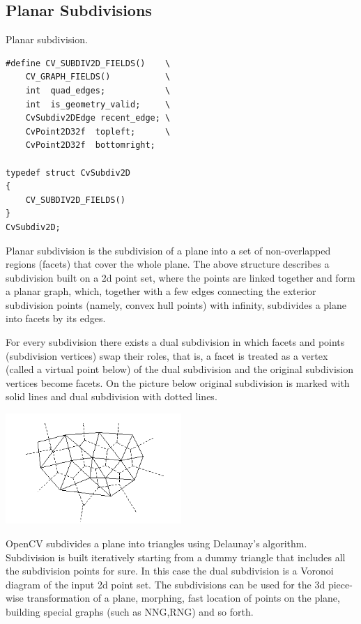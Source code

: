 \subsection{Planar Subdivisions}

\label{CvSubdiv2D}

Planar subdivision.

\begin{lstlisting}
#define CV_SUBDIV2D_FIELDS()    \
    CV_GRAPH_FIELDS()           \
    int  quad_edges;            \
    int  is_geometry_valid;     \
    CvSubdiv2DEdge recent_edge; \
    CvPoint2D32f  topleft;      \
    CvPoint2D32f  bottomright;

typedef struct CvSubdiv2D
{
    CV_SUBDIV2D_FIELDS()
}
CvSubdiv2D;
\end{lstlisting}

Planar subdivision is the subdivision of a plane into a set of
non-overlapped regions (facets) that cover the whole plane. The above
structure describes a subdivision built on a 2d point set, where the points
are linked together and form a planar graph, which, together with a few
edges connecting the exterior subdivision points (namely, convex hull points)
with infinity, subdivides a plane into facets by its edges.

For every subdivision there exists a dual subdivision in which facets and
points (subdivision vertices) swap their roles, that is, a facet is
treated as a vertex (called a virtual point below) of the dual subdivision and
the original subdivision vertices become facets. On the picture below
original subdivision is marked with solid lines and dual subdivision
with dotted lines.

\includegraphics[width=0.5\textwidth]{pics/subdiv.png}

OpenCV subdivides a plane into triangles using Delaunay's
algorithm. Subdivision is built iteratively starting from a dummy
triangle that includes all the subdivision points for sure. In this
case the dual subdivision is a Voronoi diagram of the input 2d point set. The
subdivisions can be used for the 3d piece-wise transformation of a plane,
morphing, fast location of points on the plane, building special graphs
(such as NNG,RNG) and so forth.


